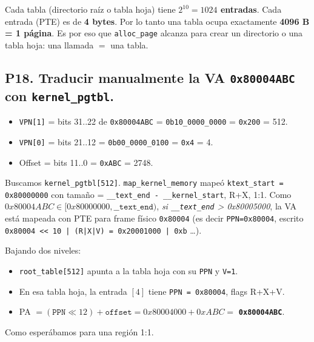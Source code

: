 \documentclass[11pt,a4paper]{article}
\begin{document}
\begin{respuesta}
Cada tabla (directorio raíz o tabla hoja) tiene \textbf{$2^{10}=1024$
entradas}. Cada entrada (PTE) es de \textbf{4 bytes}. Por lo tanto
una tabla ocupa exactamente \textbf{4096 B = 1 página}. Es por eso
que \texttt{alloc\_page} alcanza para crear un directorio o una
tabla hoja: una llamada $=$ una tabla.
\end{respuesta}

\subsection*{P18. Traducir manualmente la VA \texttt{0x80004ABC} con \texttt{kernel\_pgtbl}.}

\begin{respuesta}
\begin{itemize}[leftmargin=*,nosep]
    \item \texttt{VPN[1]} = bits 31..22 de \texttt{0x80004ABC} =
        \texttt{0b10\_0000\_0000} = \texttt{0x200} = 512.
    \item \texttt{VPN[0]} = bits 21..12 = \texttt{0b00\_0000\_0100}
        = \texttt{0x4} = 4.
    \item Offset = bits 11..0 = \texttt{0xABC} = 2748.
\end{itemize}

Buscamos \texttt{kernel\_pgtbl[512]}. \texttt{map\_kernel\_memory}
mapeó \texttt{ktext\_start = 0x80000000} con tamaño =
\texttt{\_\_text\_end - \_\_kernel\_start}, R+X, 1:1. Como
$0x80004ABC \in [0x80000000, \texttt{\_\_text\_end})$, \emph{si
\texttt{\_\_text\_end} > 0x80005000}, la VA está mapeada con
PTE para frame físico \texttt{0x80004} (es decir
\texttt{PPN=0x80004}, escrito \texttt{0x80004 << 10 | (R|X|V) =
0x20001000 | 0xb} \dots).

Bajando dos niveles:

\begin{itemize}[nosep,leftmargin=*]
    \item \texttt{root\_table[512]} apunta a la tabla hoja con su
        \texttt{PPN} y \texttt{V=1}.
    \item En esa tabla hoja, la entrada $[4]$ tiene \texttt{PPN =
        0x80004}, flags R+X+V.
    \item PA $= (\texttt{PPN} \ll 12) + \texttt{offset} = 0x80004000
        + 0xABC = $ \textbf{\texttt{0x80004ABC}}.
\end{itemize}

Como esperábamos para una región 1:1.
\end{respuesta}
\end{document}
